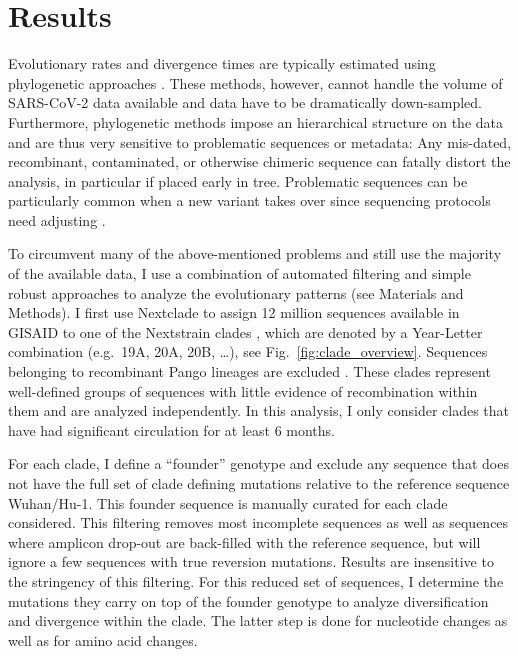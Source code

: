 \documentclass[aps,rmp, twocolumn]{revtex4}
\begin{document}
\section*{Results}

Evolutionary rates and divergence times are typically estimated using phylogenetic approaches \citep{drummond_relaxed_2006}.
These methods, however, cannot handle the volume of SARS-CoV-2 data available and data have to be dramatically down-sampled.
Furthermore, phylogenetic methods impose an hierarchical structure on the data and are thus very sensitive to problematic sequences or metadata: Any mis-dated, recombinant, contaminated, or otherwise chimeric sequence can fatally distort the analysis, in particular if placed early in tree.
Problematic sequences can be particularly common when a new variant takes over since sequencing protocols need adjusting \citep{deMaio_issues_2020}.

To circumvent many of the above-mentioned problems and still use the majority of the available data, I use a combination of automated filtering and simple robust approaches to analyze the evolutionary patterns (see Materials and Methods).
I first use Nextclade \citep{aksamentov_nextclade_2021} to assign 12 million sequences available in GISAID \citep{shu_gisaid_2017} to one of the Nextstrain clades \citep{hadfield_nextstrain_2018,roemer_sars-cov-2_2022}, which are denoted by a Year-Letter combination (e.g.~19A, 20A, 20B, \ldots), see Fig.~\ref{fig:clade_overview}.
Sequences belonging to recombinant Pango lineages are excluded \citep{rambaut_dynamic_2020}.
These clades represent well-defined groups of sequences with little evidence of recombination within them and are analyzed independently.
In this analysis, I only consider clades that have had significant circulation for at least 6 months.

For each clade, I define a ``founder'' genotype and exclude any sequence that does not have the full set of clade defining mutations relative to the reference sequence Wuhan/Hu-1.
This founder sequence is manually curated for each clade considered.
This filtering removes most incomplete sequences as well as sequences where amplicon drop-out are back-filled with the reference sequence, but will ignore a few sequences with true reversion mutations.
Results are insensitive to the stringency of this filtering.
For this reduced set of sequences, I determine the mutations they carry on top of the founder genotype to analyze diversification and divergence within the clade.
The latter step is done for nucleotide changes as well as for amino acid changes.
\end{document}
